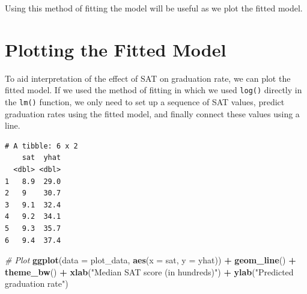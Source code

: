 \documentclass[]{book}
\newenvironment{Shaded}{\begin{snugshade}}{\end{snugshade}}
\newcommand{\CommentTok}[1]{\textcolor[rgb]{0.56,0.35,0.01}{\textit{#1}}}
\newcommand{\DataTypeTok}[1]{\textcolor[rgb]{0.13,0.29,0.53}{#1}}
\newcommand{\FloatTok}[1]{\textcolor[rgb]{0.00,0.00,0.81}{#1}}
\newcommand{\KeywordTok}[1]{\textcolor[rgb]{0.13,0.29,0.53}{\textbf{#1}}}
\newcommand{\NormalTok}[1]{#1}
\newcommand{\OperatorTok}[1]{\textcolor[rgb]{0.81,0.36,0.00}{\textbf{#1}}}
\newcommand{\StringTok}[1]{\textcolor[rgb]{0.31,0.60,0.02}{#1}}
\begin{document}
Using this method of fitting the model will be useful as we plot the fitted model.

\hypertarget{plotting-the-fitted-model}{%
\section{Plotting the Fitted Model}\label{plotting-the-fitted-model}}

To aid interpretation of the effect of SAT on graduation rate, we can plot the fitted model. If we used the method of fitting in which we used \texttt{log()} directly in the \texttt{lm()} function, we only need to set up a sequence of SAT values, predict graduation rates using the fitted model, and finally connect these values using a line.

\begin{Shaded}
\end{Shaded}

\begin{verbatim}
# A tibble: 6 x 2
    sat  yhat
  <dbl> <dbl>
1   8.9  29.0
2   9    30.7
3   9.1  32.4
4   9.2  34.1
5   9.3  35.7
6   9.4  37.4
\end{verbatim}

\begin{Shaded}
\begin{Highlighting}[]
\CommentTok{# Plot}
\KeywordTok{ggplot}\NormalTok{(}\DataTypeTok{data =}\NormalTok{ plot_data, }\KeywordTok{aes}\NormalTok{(}\DataTypeTok{x =}\NormalTok{ sat, }\DataTypeTok{y =}\NormalTok{ yhat)) }\OperatorTok{+}
\StringTok{    }\KeywordTok{geom_line}\NormalTok{() }\OperatorTok{+}
\StringTok{    }\KeywordTok{theme_bw}\NormalTok{() }\OperatorTok{+}
\StringTok{  }\KeywordTok{xlab}\NormalTok{(}\StringTok{"Median SAT score (in hundreds)"}\NormalTok{) }\OperatorTok{+}
\StringTok{  }\KeywordTok{ylab}\NormalTok{(}\StringTok{"Predicted graduation rate"}\NormalTok{)}
\end{Highlighting}
\end{Shaded}
\end{document}
